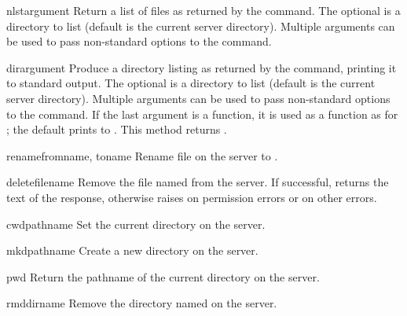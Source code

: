 \begin{methoddesc}[FTP]{nlst}{argument\optional{, \ldots}}
Return a list of files as returned by the  command.  The
optional  is a directory to list (default is the current
server directory).  Multiple arguments can be used to pass
non-standard options to the  command.
\end{methoddesc}

\begin{methoddesc}[FTP]{dir}{argument\optional{, \ldots}}
Produce a directory listing as returned by the  command,
printing it to standard output.  The optional  is a
directory to list (default is the current server directory).  Multiple
arguments can be used to pass non-standard options to the 
command.  If the last argument is a function, it is used as a
 function as for ; the default
prints to .  This method returns .
\end{methoddesc}

\begin{methoddesc}[FTP]{rename}{fromname, toname}
Rename file  on the server to .
\end{methoddesc}

\begin{methoddesc}[FTP]{delete}{filename}
Remove the file named  from the server.  If successful,
returns the text of the response, otherwise raises
 on permission errors or
 on other errors.
\end{methoddesc}

\begin{methoddesc}[FTP]{cwd}{pathname}
Set the current directory on the server.
\end{methoddesc}

\begin{methoddesc}[FTP]{mkd}{pathname}
Create a new directory on the server.
\end{methoddesc}

\begin{methoddesc}[FTP]{pwd}{}
Return the pathname of the current directory on the server.
\end{methoddesc}

\begin{methoddesc}[FTP]{rmd}{dirname}
Remove the directory named  on the server.
\end{methoddesc}

